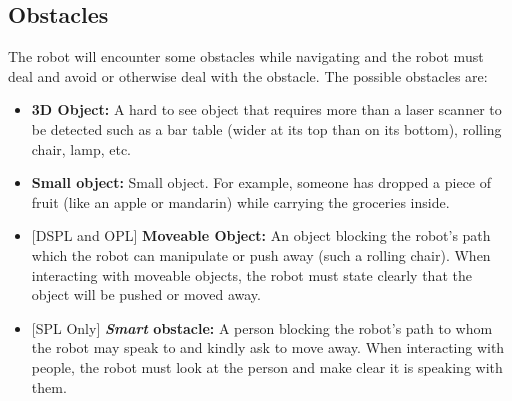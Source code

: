 \subsection{Obstacles}
The robot will encounter some obstacles while navigating and the robot must deal and avoid or otherwise deal with the obstacle. 
The possible obstacles are:
\begin{itemize}
  \item \textbf{3D Object:} A hard to see object that requires more than a laser scanner to be detected such as a bar table (wider at its top than on its bottom), rolling chair, lamp, etc.

  \item \textbf{Small object:} Small object. For example, someone has dropped a piece of fruit (like an apple or mandarin) while carrying the groceries inside.

  \item {[DSPL and OPL]} \textbf{Moveable Object:} An object blocking the robot's path which the robot can manipulate or push away (such a rolling chair). When interacting with moveable objects, the robot must state clearly that the object will be pushed or moved away.

  \item {[SPL Only]} \textbf{\textit{Smart} obstacle:} A person blocking the robot's path to whom the robot may speak to and kindly ask to move away. When interacting with people, the robot must look at the person and make clear it is speaking with them.
\end{itemize}


